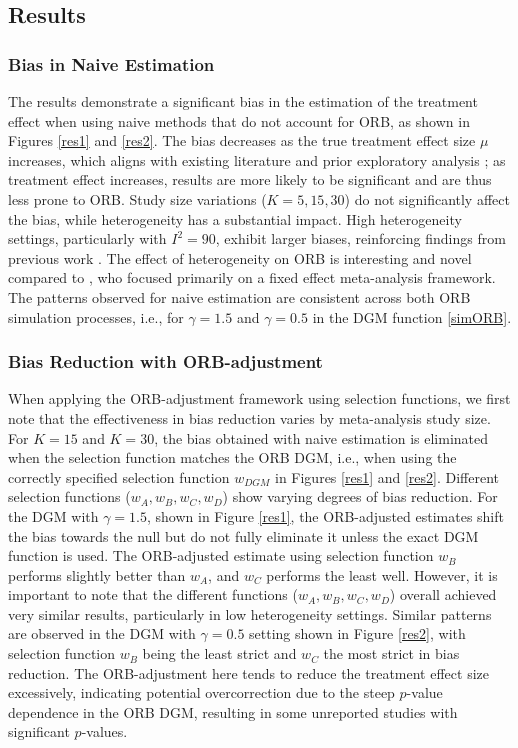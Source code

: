 \documentclass[twocolumn]{article}\usepackage[]{graphicx}\usepackage[]{xcolor}
\providecommand{\DIFaddbegin}{} %
\providecommand{\DIFaddend}{} %
\newcommand{\DIFaddincludegraphics}[2][]{{\color{blue}\fbox{\DIFOincludegraphics[#1]{#2}}}} %
\DeclareRobustCommand{\DIFaddbegin}{\DIFOaddbegin \let\includegraphics\DIFaddincludegraphics} %
\DeclareRobustCommand{\DIFaddend}{\DIFOaddend \let\includegraphics\DIFOincludegraphics} %
\begin{document}
\DIFaddend \subsection{Results} \DIFaddbegin \label{3.2}
\DIFaddend 

\subsubsection{Bias in Naive Estimation}
The results demonstrate a significant bias in the estimation of the treatment effect when using naive methods that do not account for ORB, as shown in Figures \ref{res1} and \ref{res2}. The bias decreases as the true treatment effect size $\mu$ increases, which aligns with existing literature \citep{Copas2019, Bay, dutch} and prior exploratory analysis \citep{mythesis}; as treatment effect increases, results are more likely to be significant and are thus less prone to ORB. Study size variations ($K=5, 15, 30$) do not significantly affect the bias, while heterogeneity has a substantial impact. High heterogeneity settings, particularly with $I^2=90$, exhibit larger biases, reinforcing findings from previous work \citep{mythesis}. The effect of heterogeneity on ORB is interesting and novel compared to \citet{Copas2019}, who focused primarily on a fixed effect meta-analysis framework. The patterns observed for naive estimation are consistent across both ORB simulation processes, i.e., for $\gamma=1.5$ and $\gamma=0.5$ in the DGM function \eqref{simORB}.

\subsubsection{Bias Reduction with ORB-adjustment}
When applying the ORB-adjustment framework using selection functions, we first note that the effectiveness in bias reduction varies by meta-analysis study size. For $K=15$ and $K=30$, the bias obtained with naive estimation is eliminated when the selection function matches the ORB DGM, i.e., when using the correctly specified selection function $w_{DGM}$ in Figures \ref{res1} and \ref{res2}. Different selection functions ($w_A, w_B, w_C, w_D$) show varying degrees of bias reduction. For the DGM with $\gamma=1.5$, shown in Figure \ref{res1}, the ORB-adjusted estimates shift the bias towards the null but do not fully eliminate it unless the exact DGM function is used. The ORB-adjusted estimate using selection function $w_B$ performs slightly better than $w_A$, and $w_C$ performs the least well. However, it is important to note that the different functions ($w_A, w_B, w_C, w_D$) overall achieved very similar results, particularly in low heterogeneity settings. Similar patterns are observed in the DGM with $\gamma=0.5$ setting shown in Figure \ref{res2}, with selection function $w_B$ being the least strict and $w_C$ the most strict in bias reduction. The ORB-adjustment here tends to reduce the treatment effect size excessively, indicating potential overcorrection due to the steep $p$-value dependence in the ORB DGM, resulting in some unreported studies with significant $p$-values. 
\end{document}
